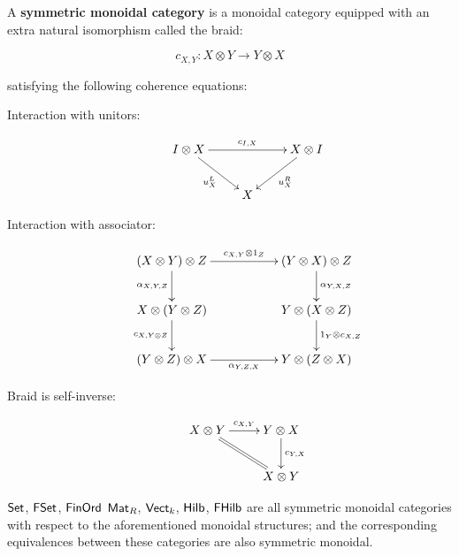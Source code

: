 \begin{definition}
A {\bf symmetric monoidal category} is a monoidal category equipped with an extra natural isomorphism called the braid:

$$
c_{X,Y}:X\otimes Y \to Y\otimes X
$$

satisfying the following coherence equations:

\begin{description}
\item[Interaction with unitors:]
$$
\xymatrix{
I \otimes X \ar[rr]^{c_{I,X}} \ar[rd]_{u^L_X} && X \otimes I \ar[ld]^{u^R_X} \\
& X &
}
$$

\item[Interaction with associator:]
$$
\xymatrix{
  (X\otimes Y)\otimes Z \ar[rr]^{c_{X,Y}\otimes 1_Z} \ar[d]_{\alpha_{X,Y,Z}}
    &
    &  (Y\otimes X)\otimes Z \ar[d]^{\alpha_{Y,X,Z}}
  \\X\otimes(Y\otimes Z) \ar[d]_{c_{X,Y\otimes Z}}
    &
    &  Y\otimes(X\otimes Z) \ar[d]^{1_Y\otimes c_{X,Z}}
  \\ (Y\otimes Z)\otimes X \ar[rr]_{\alpha_{Y,Z,X}}
    &
    & Y\otimes (Z\otimes X)
}
$$

\item[Braid is self-inverse:]
$$
\xymatrix{
   X\otimes Y \ar[r]^{c_{X,Y}} \ar@{=}[dr]
   &  Y\otimes X \ar[d]^{c_{Y,X}}\\
   & X \otimes Y
}
$$
\end{description}

\end{definition}


\begin{example}
$\mathsf{Set}$, $\mathsf{FSet}$, $\mathsf{FinOrd}$ $\mathsf{Mat}_R$, $\mathsf{Vect}_k$, $\mathsf{Hilb}$, $\mathsf{FHilb}$ are all symmetric monoidal categories with respect to the aforementioned monoidal structures; and the corresponding equivalences between these categories are also symmetric monoidal.
\end{example}

